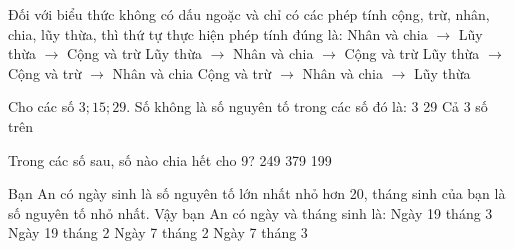 \documentclass[12pt,a4paper]{article}
\begin{document}
\begin{ex}
Đối với biểu thức không có dấu ngoặc và chỉ có các phép tính cộng, trừ, nhân, chia, lũy thừa, thì thứ tự thực hiện phép tính đúng là:
\choice
{Nhân và chia $\to$ Lũy thừa $\to$ Cộng và trừ}
{\True Lũy thừa $\to$ Nhân và chia $\to$ Cộng và trừ}
{Lũy thừa $\to$ Cộng và trừ $\to$ Nhân và chia}
{Cộng và trừ $\to$ Nhân và chia $\to$ Lũy thừa}
\end{ex}

\begin{ex}
Cho các số $3; 15; 29$. Số không là số nguyên tố trong các số đó là:
\choice
{3}
{}
{29}
{Cả 3 số trên}
\end{ex}

\begin{ex}
Trong các số sau, số nào chia hết cho 9?
\choice
{}
{249}
{379}
{199}
\end{ex}

\begin{ex}
Bạn An có ngày sinh là số nguyên tố lớn nhất nhỏ hơn 20, tháng sinh của bạn là số nguyên tố nhỏ nhất. Vậy bạn An có ngày và tháng sinh là:
\choice
{Ngày 19 tháng 3}
{\True Ngày 19 tháng 2}
{Ngày 7 tháng 2}
{Ngày 7 tháng 3}
\end{ex}
\end{document}
